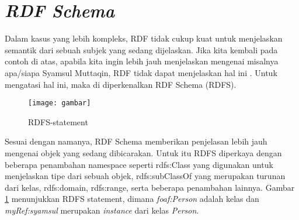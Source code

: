\section{\emph{RDF Schema}}
Dalam kasus yang lebih kompleks, RDF tidak cukup kuat untuk menjelaskan semantik dari sebuah subjek yang sedang dijelaskan. Jika kita kembali pada contoh di atas, apabila kita ingin lebih jauh menjelaskan mengenai misalnya apa/siapa Syamsul Muttaqin, RDF tidak dapat menjelaskan hal ini \citep*{antoniou}. Untuk mengatasi hal ini, maka di diperkenalkan RDF Schema (RDFS).

\begin{figure}[h]
	\centering
	\texttt{[image: gambar]}
	\caption{RDFS-statement}
	\label{fig:rdfs_statement}
\end{figure}

Sesuai dengan namanya, RDF Schema memberikan penjelasan lebih jauh mengenai objek yang sedang dibicarakan. Untuk itu RDFS diperkaya dengan beberapa penambahan namespace seperti rdfs:Class yang digunakan untuk menjelaskan tipe dari sebuah objek, rdfs:subClassOf yang merupakan turunan dari kelas, rdfs:domain, rdfs:range, serta beberapa penambahan lainnya. Gambar \ref{fig:rdfs_statement} menunjukkan RDFS statement, dimana \emph{foaf:Person} adalah kelas dan \emph{myRef:syamsul} merupakan \emph{instance} dari kelas \emph{Person}.